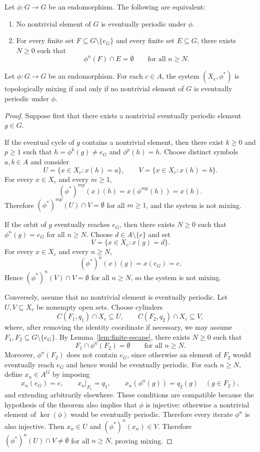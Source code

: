 \documentclass[10pt,a4paper]{amsart}
\begin{document}
\begin{lemma}\label{lem:finite-escape}
Let $\phi:G\to G$ be an endomorphism. The following are equivalent:
\begin{enumerate}
\item No nontrivial element of $G$ is eventually periodic under $\phi$.
\item For every finite set $F\subseteq G\setminus\{e_G\}$ and every finite set $E\subseteq G$, there exists $N\geq 0$ such that
\[
\phi^n(F)\cap E=\emptyset
\qquad\text{for all }n\geq N.
\]
\end{enumerate}
\end{lemma}

\begin{theorem}\label{thm:general-mixing}
Let $\phi:G\to G$ be an endomorphism. For each $c\in A$, the system $(X_c,\phi^*)$ is topologically mixing if and only if no nontrivial element of $G$ is eventually periodic under $\phi$.
\end{theorem}

\begin{proof}
Suppose first that there exists a nontrivial eventually periodic element $g\in G$.

If the eventual cycle of $g$ contains a nontrivial element, then there exist $k\geq 0$ and $p\geq 1$ such that $h=\phi^k(g)\neq e_G$ and $\phi^p(h)=h$. Choose distinct symbols $a,b\in A$ and consider
\[
U=\{x\in X_c:x(h)=a\},
\qquad
V=\{x\in X_c:x(h)=b\}.
\]
For every $x\in X_c$ and every $m\geq 1$,
\[
(\phi^*)^{mp}(x)(h)=x(\phi^{mp}(h))=x(h).
\]
Therefore $(\phi^*)^{mp}(U)\cap V=\emptyset$ for all $m\geq 1$, and the system is not mixing.

If the orbit of $g$ eventually reaches $e_G$, then there exists $N\geq 0$ such that $\phi^n(g)=e_G$ for all $n\geq N$. Choose $d\in A\setminus\{c\}$ and set
\[
V=\{x\in X_c:x(g)=d\}.
\]
For every $x\in X_c$ and every $n\geq N$,
\[
(\phi^*)^n(x)(g)=x(e_G)=c.
\]
Hence $(\phi^*)^n(V)\cap V=\emptyset$ for all $n\geq N$, so the system is not mixing.

Conversely, assume that no nontrivial element is eventually periodic. Let $U,V\subseteq X_c$ be nonempty open sets. Choose cylinders
\[
C(F_1,q_1)\cap X_c\subseteq U,
\qquad
C(F_2,q_2)\cap X_c\subseteq V,
\]
where, after removing the identity coordinate if necessary, we may assume $F_1,F_2\subseteq G\setminus\{e_G\}$. By Lemma~\ref{lem:finite-escape}, there exists $N\geq 0$ such that
\[
F_1\cap \phi^n(F_2)=\emptyset
\qquad\text{for all }n\geq N.
\]
Moreover, $\phi^n(F_2)$ does not contain $e_G$, since otherwise an element of $F_2$ would eventually reach $e_G$ and hence would be eventually periodic. For each $n\geq N$, define $x_n\in A^G$ by imposing
\[
x_n(e_G)=c,
\qquad
x_n|_{F_1}=q_1,
\qquad
x_n(\phi^n(g))=q_2(g)\quad (g\in F_2),
\]
and extending arbitrarily elsewhere. These conditions are compatible because the hypothesis of the theorem also implies that $\phi$ is injective: otherwise a nontrivial element
of $\ker(\phi)$ would be eventually periodic. Therefore every iterate $\phi^n$ is also injective. Then $x_n\in U$ and $(\phi^*)^n(x_n)\in V$. Therefore $(\phi^*)^n(U)\cap V\neq\emptyset$ for all $n\geq N$, proving mixing.
\end{proof}
\end{document}
